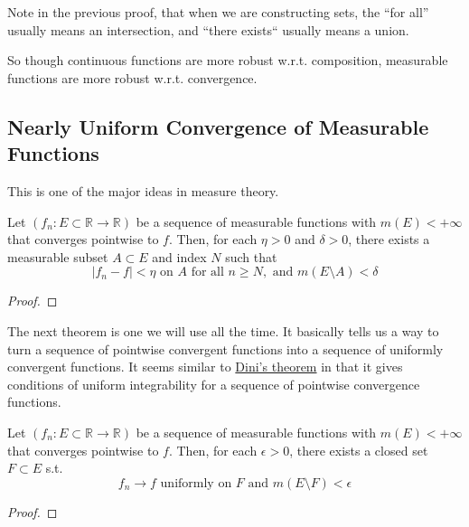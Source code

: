   Note in the previous proof, that when we are constructing sets, the ``for all'' usually means an intersection, and ``there exists`` usually means a union. 

  So though continuous functions are more robust w.r.t. composition, measurable functions are more robust w.r.t. convergence. 

\subsection{Nearly Uniform Convergence of Measurable Functions} 

  This is one of the major ideas in measure theory. 

  \begin{lemma} 
    Let $(f_n: E \subset \mathbb{R} \to \mathbb{R})$ be a sequence of measurable functions with $m(E) < +\infty$ that converges pointwise to $f$. Then, for each $\eta > 0$ and $\delta > 0$, there exists a measurable subset $A \subset E$ and index $N$ such that 
    \begin{equation}
      |f_n - f| < \eta \text{ on } A \text{ for all } n \geq N, \text{ and } m(E \setminus A) < \delta 
    \end{equation}
  \end{lemma}
  \begin{proof}
    
  \end{proof}

  The next theorem is one we will use all the time. It basically tells us a way to turn a sequence of pointwise convergent functions into a sequence of uniformly convergent functions. It seems similar to \hyperref[real-thm:dini]{Dini's theorem} in that it gives conditions of uniform integrability for a sequence of pointwise convergence functions. 

  \begin{theorem}[Egorov]
    Let $(f_n: E \subset \mathbb{R} \to \mathbb{R})$ be a sequence of measurable functions with $m(E) < +\infty$ that converges pointwise to $f$. Then, for each $\epsilon > 0$, there exists a closed set $F \subset E$  s.t. 
    \begin{equation}
      f_n \to f \text{ uniformly on } F \text{ and } m(E \setminus F) < \epsilon
    \end{equation}
  \end{theorem}
  \begin{proof}
    
  \end{proof}

